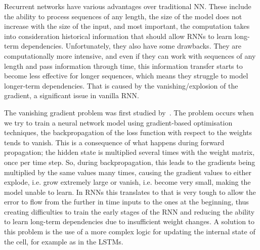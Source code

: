Recurrent networks have various advantages over traditional NN. These include the ability to process sequences of any length, the size of the model does not increase with the size of the input, and most important, the computation takes into consideration historical information that should allow RNNs to learn long-term dependencies. Unfortunately, they also have some drawbacks. They are computationally more intensive, and even if they can work with sequences of any length and pass information through time, this information transfer starts to become less effective for longer sequences, which means they struggle to model longer-term dependencies. That is caused by the vanishing/explosion of the gradient, a significant issue in vanilla RNN. 

\newpage
The vanishing gradient problem was first studied by~\citep{Hochreiter:91, bengio1994vanishing}. The problem occurs when we try to train a neural network model using gradient-based optimisation techniques, the backpropagation of the loss function with respect to the weights tends to vanish. This is a consequence of what happens during forward propagation; the hidden state is multiplied several times with the weight matrix, once per time step. So, during backpropagation, this leads to the gradients being multiplied by the same values many times, causing the gradient values to either explode, i.e. grow extremely large or vanish, i.e. become very small, making the model unable to learn. In RNNs this translates to that is very tough to allow the error to flow from the further in time inputs to the ones at the beginning, thus creating difficulties to train the early stages of the RNN and reducing the ability to learn long-term dependencies due to insufficient weight changes. A solution to this problem is the use of a more complex logic for updating the internal state of the cell, for example as in the LSTMs.



